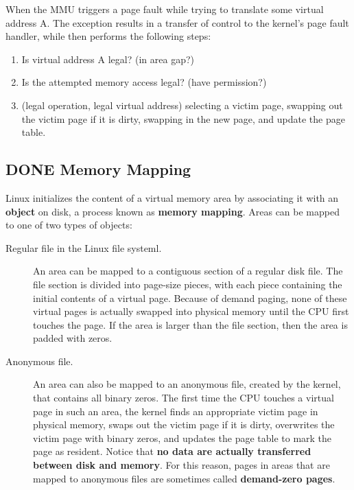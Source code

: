 \documentclass[11pt]{article}
\begin{document}
\begin{enumerate}
When the MMU triggers a page fault while trying to translate some virtual address A. The exception results in a transfer of control to the kernel's page fault handler, while then performs the following steps:\\
\begin{enumerate}
\item Is virtual address A legal? (in area gap?)\\
\item Is the attempted memory access legal? (have permission?)\\
\item (legal operation, legal virtual address) selecting a victim page, swapping out the victim page if it is dirty, swapping in the new page, and update the page table.\\
\end{enumerate}
\end{enumerate}


\subsection{{\bfseries\sffamily DONE} Memory Mapping}
\label{sec:org1a92847}
Linux initializes the content of a virtual memory area by associating it with an \textbf{object} on disk, a process known as \textbf{memory mapping}. Areas can be mapped to one of two types of objects:\\
\begin{description}
\item[{Regular file in the Linux file systeml.}] An area can be mapped to a contiguous section of a regular disk file. The file section is divided into page-size pieces, with each piece containing the initial contents of a virtual page. Because of demand paging, none of these virtual pages is actually swapped into physical memory until the CPU first touches the page. If the area is larger than the file section, then the area is padded with zeros.\\
\item[{Anonymous file.}] An area can also be mapped to an anonymous file, created by the kernel, that contains all binary zeros. The first time the CPU touches a virtual page in such an area, the kernel finds an appropriate victim page in physical memory, swaps out the victim page if it is dirty, overwrites the victim page with binary zeros, and updates the page table to mark the page as resident. Notice that \textbf{no data are actually transferred between disk and memory}. For this reason, pages in areas that are mapped to anonymous files are sometimes called \textbf{demand-zero pages}.\\
\end{description}
\end{document}
